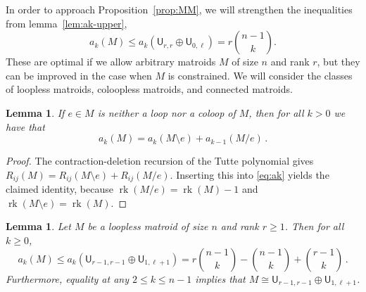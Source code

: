 \documentclass[pagesize,paper=A4,11pt,bibliography=totoc,oneside]{scrartcl}
\newtheorem{lemma}[thm]{Lemma}
\DeclareMathOperator{\rk}{rk}
\newcommand{\UM}[2]{\mathsf{U}_{#2,#1}} %
\begin{document}
In order to approach Proposition~\ref{prop:MM}, we will strengthen the inequalities from lemma~\ref{lem:ak-upper},
\begin{equation*}
    a_k(M)\leq a_k(\UM{r}{r}\oplus\UM{\ell}{0}) = r\binom{n-1}{k}.
\end{equation*}
These are optimal if we allow arbitrary matroids $M$ of size $n$ and rank $r$, but they can be improved in the case when $M$ is constrained. We will consider the classes of loopless matroids, coloopless matroids, and connected matroids.
\begin{lemma}\label{lem:contract-delete}
    If $e\in M$ is neither a loop nor a coloop of $M$, then for all $k>0$ we have that
    \begin{equation*}
        a_k(M)=a_k(M\setminus e)+a_{k-1}(M/e)\,.
    \end{equation*}
\end{lemma}
\begin{proof}
    The contraction-deletion recursion of the Tutte polynomial gives $R_{ij}(M)=R_{ij}(M\setminus e)+R_{ij}(M/e)$. Inserting this into \eqref{eq:ak} yields the claimed identity, because $\rk(M/e)=\rk(M)-1$ and $\rk(M\setminus e)=\rk(M)$.
\end{proof}
\begin{lemma}\label{lem:upper-noloops}
    Let $M$ be a loopless matroid of size $n$ and rank $r\geq1$. Then for all $k\geq0$,
    \begin{equation*}
        a_k(M)\leq a_k(\UM{r-1}{r-1}\oplus \UM{\ell+1}{1})
        = r\binom{n-1}{k} -\binom{n-1}{k} + \binom{r-1}{k}
        \,.
    \end{equation*}
    Furthermore, equality at any $2\leq k\leq n-1$ implies that $M\cong\UM{r-1}{r-1}\oplus\UM{\ell+1}{1}$.
\end{lemma}
\end{document}
